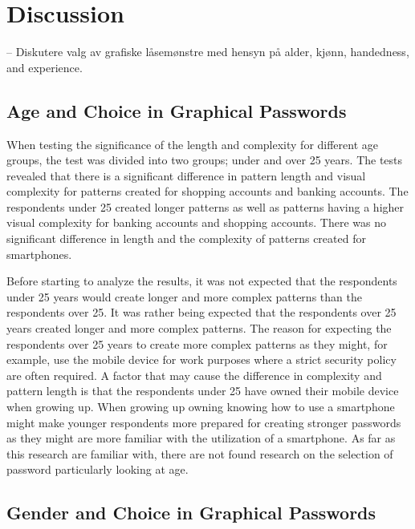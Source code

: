 \chapter{Discussion}\label{chap:discussion}

  -- Diskutere valg av grafiske låsemønstre med hensyn på alder, kjønn, handedness, and experience. 

  \clearpage
  
  \clearpage
  \section{Age and Choice in Graphical Passwords}

    When testing the significance of the length and complexity for different age groups, the test was divided into two groups; under and over 25 years. The tests revealed that there is a significant difference in pattern length and visual complexity for patterns created for shopping accounts and banking accounts. The respondents under 25 created longer patterns as well as patterns having a higher visual complexity for banking accounts and shopping accounts. There was no significant difference in length and the complexity of patterns created for smartphones. 

    Before starting to analyze the results, it was not expected that the respondents under 25 years would create longer and more complex patterns than the respondents over 25. It was rather being expected that the respondents over 25 years created longer and more complex patterns. The reason for expecting the respondents over 25 years to create more complex patterns as they might, for example, use the mobile device for work purposes where a strict security policy are often required. A factor that may cause the difference in complexity and pattern length is that the respondents under 25 have owned their mobile device when growing up. When growing up owning knowing how to use a smartphone might make younger respondents more prepared for creating stronger passwords as they might are more familiar with the utilization of a smartphone. As far as this research are familiar with, there are not found research on the selection of password particularly looking at age.

  \section{Gender and Choice in Graphical Passwords}

